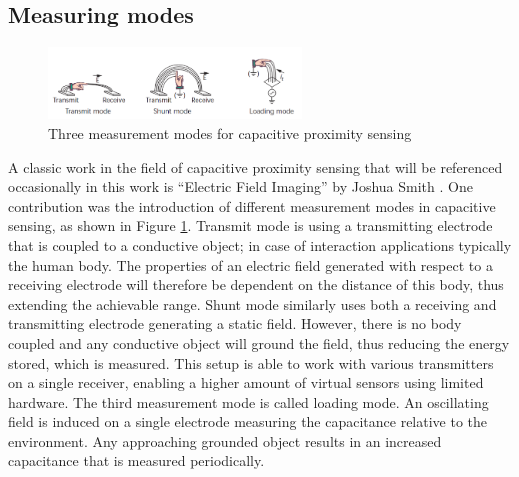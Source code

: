 \subsection{Measuring modes}
\begin{figure} [h]
\centering
\includegraphics[width=0.6\textwidth]{images/cap_sensing_modes.png} 
\caption{Three measurement modes for capacitive proximity sensing \cite{Smith1996a}}
\label{fig:cap_sensing_modes}
\end{figure}
A classic work in the field of capacitive proximity sensing that will be referenced occasionally in this work is “Electric Field Imaging” by Joshua Smith \cite{smith1999thesis}. One contribution was the introduction of different measurement modes in capacitive sensing, as shown in Figure \ref{fig:cap_sensing_modes}. 
Transmit mode is using a transmitting electrode that is coupled to a conductive object; in case of interaction applications typically the human body. The properties of an electric field generated with respect to a receiving electrode will therefore be dependent on the distance of this body, thus extending the achievable range.
Shunt mode similarly uses both a receiving and transmitting electrode generating a static field. However, there is no body coupled and any conductive object will ground the field, thus reducing the energy stored, which is measured. This setup is able to work with various transmitters on a single receiver, enabling a higher amount of virtual sensors using limited hardware. The third measurement mode is called loading mode. An oscillating field is induced on a single electrode measuring the capacitance relative to the environment. Any approaching grounded object results in an increased capacitance that is measured periodically.
